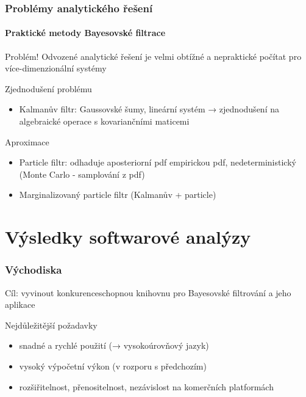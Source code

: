 \documentclass[12pt]{beamer}
\begin{document}
\begin{frame}
	\frametitle{Problémy analytického řešení}
	\framesubtitle{Praktické metody Bayesovské filtrace}

	\begin{alertblock}{Problém!}
		Odvozené analytické řešení je velmi obtížné a nepraktické počítat pro více-dimenzionální
		systémy
	\end{alertblock}

	\begin{block}{Zjednodušení problému}
		\begin{itemize}
			\item Kalmanův filtr: Gaussovské šumy, lineární systém → zjednodušení
			na algebraické operace s kovariančními maticemi
		\end{itemize}
	\end{block}

	\begin{block}{Aproximace}
		\begin{itemize}
			\item Particle filtr: odhaduje aposteriorní pdf empirickou pdf,
			nedeterministický (Monte Carlo - samplování z pdf)
			\item Marginalizovaný particle filtr (Kalmanův + particle)
		\end{itemize}
	\end{block}

\end{frame}

\section{Výsledky softwarové analýzy}

\begin{frame}
	\frametitle{Východiska}

	{\large Cíl: vyvinout konkurenceschopnou knihovnu pro Bayesovské filtrování a jeho aplikace}

	\vspace{8mm}

	\begin{block}{Nejdůležitější požadavky}
		\begin{itemize}
			\item snadné a rychlé použití {\scriptsize (→ vysokoúrovňový jazyk)}
			\item vysoký výpočetní výkon {\scriptsize (v rozporu s předchozím)}
			\item rozšiřitelnost, přenositelnost, nezávislost na komerčních platformách
		\end{itemize}
 	\end{block}
\end{frame}
\end{document}
